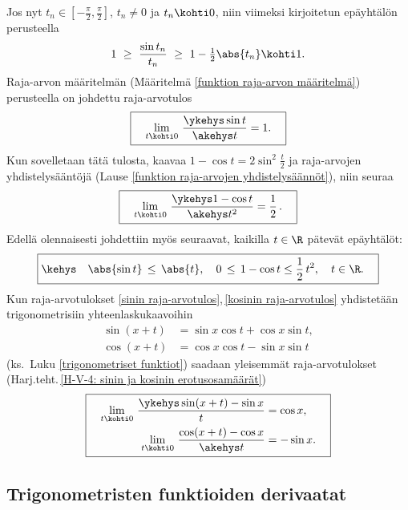 Jos nyt $t_n\in [-\tfrac{\pi}{2},\tfrac{\pi}{2}]$, $t_n\neq 0$ ja $t_n\kohti 0$, niin viimeksi
kirjoitetun epäyhtälön perusteella
\[
1\ \ge\ \frac{\sin t_n}{t_n}\ \ge\ 1-\tfrac{1}{2}\abs{t_n} \kohti 1.
\]
Raja-arvon määritelmän (Määritelmä \ref{funktion raja-arvon määritelmä}) perusteella on 
johdettu raja-arvotulos
\begin{equation} \label{sinin raja-arvotulos}
\boxed{\quad \lim_{t\kohti 0}\,\frac{\ykehys\sin t}{\akehys t}=1. \quad}
\end{equation}
Kun sovelletaan tätä tulosta, kaavaa $1-\cos t=2\sin^2\tfrac{t}{2}$ ja raja-arvojen
yhdistelysääntöjä (Lause \ref{funktion raja-arvojen yhdistelysäännöt}), niin seuraa
\begin{equation} \label{kosinin raja-arvotulos}
\boxed{\quad \lim_{t\kohti 0}\,\frac{\ykehys 1-\cos t}{\akehys t^2}=\frac{1}{2}\,. \quad}
\end{equation}
Edellä olennaisesti johdettiin myös seuraavat, kaikilla $t\in\R$ pätevät epäyhtälöt:
\[
\boxed{\kehys\quad \abs{\sin t}\,\le\,\abs{t}, \quad 
                   0\,\le\,1-\cos t \le \frac{1}{2}\,t^2, \quad t\in\R. \quad}
\]
Kun raja-arvotulokset \eqref{sinin raja-arvotulos},\,\eqref{kosinin raja-arvotulos} yhdistetään
trigonometrisiin yhteenlaskukaavoihin
\begin{align*}
\sin (x+t) &=\sin x\cos t+\cos x\sin t, \\
\cos (x+t) &=\cos x\cos t-\sin x\sin t
\end{align*}
(ks.\ Luku \ref{trigonometriset funktiot}) saadaan yleisemmät raja-arvotulokset
(Harj.teht.\,\ref{H-V-4: sinin ja kosinin erotusosamäärät})
\begin{equation} \label{sinin ja kosinin erotusosamäärät}
\boxed{\begin{aligned}
\quad \lim_{t\kohti 0}\,\frac{\ykehys \sin(x+t)-\sin x}{t} &= \cos x, \\
       \lim_{t\kohti 0}\,\frac{\cos(x+t)-\cos x}{\akehys t}&= -\sin x. \quad
\end{aligned}}
\end{equation}

\subsection{Trigonometristen funktioiden derivaatat}

